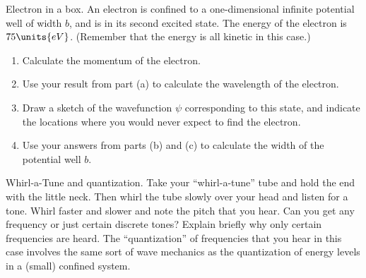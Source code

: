 \begin{aproblem}{Electron in a box.}  
  An electron is confined to a one-dimensional infinite potential well
  of width $b$, and is in its second excited state.  The energy of the
  electron is $75\units{eV}$.  (Remember that the energy is all
  kinetic in this case.)
  \begin{enumerate}
  \item Calculate the momentum of the electron.
  \item Use your result from part (a) to calculate the wavelength of
    the electron.
  \item Draw a sketch of the wavefunction $\psi$ corresponding to this
    state, and indicate the locations where you would never expect to
    find the electron.
  \item Use your answers from parts (b) and (c) to calculate the width
    of the potential well $b$.
  \end{enumerate}
\end{aproblem}


\begin{aproblem}{Whirl-a-Tune and quantization.} 
  Take your ``whirl-a-tune'' tube and hold the end with the little
  neck.  Then whirl the tube slowly over your head and listen for a
  tone.  Whirl faster and slower and note the pitch that you hear.
  Can you get any frequency or just certain discrete tones?  Explain
  briefly why only certain frequencies are heard.  The
  ``quantization'' of frequencies that you hear in this case involves
  the same sort of wave mechanics as the quantization of energy levels
  in a (small) confined system.
\end{aproblem}

\newpage

